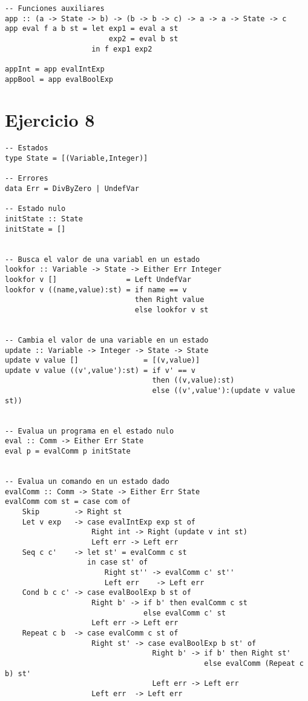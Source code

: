 \documentclass[12pt,a4paper]{article}
\begin{document}
\begin{verbatim}
-- Funciones auxiliares
app :: (a -> State -> b) -> (b -> b -> c) -> a -> a -> State -> c
app eval f a b st = let exp1 = eval a st
                        exp2 = eval b st
                    in f exp1 exp2

appInt = app evalIntExp
appBool = app evalBoolExp
\end{verbatim}

\section{Ejercicio 8}
\begin{verbatim}
-- Estados
type State = [(Variable,Integer)]

-- Errores
data Err = DivByZero | UndefVar

-- Estado nulo
initState :: State
initState = []


-- Busca el valor de una variabl en un estado
lookfor :: Variable -> State -> Either Err Integer
lookfor v []                = Left UndefVar
lookfor v ((name,value):st) = if name == v
                              then Right value
                              else lookfor v st


-- Cambia el valor de una variable en un estado
update :: Variable -> Integer -> State -> State
update v value []               = [(v,value)]
update v value ((v',value'):st) = if v' == v 
                                  then ((v,value):st)
                                  else ((v',value'):(update v value st))


-- Evalua un programa en el estado nulo
eval :: Comm -> Either Err State
eval p = evalComm p initState


-- Evalua un comando en un estado dado
evalComm :: Comm -> State -> Either Err State
evalComm com st = case com of
    Skip        -> Right st
    Let v exp   -> case evalIntExp exp st of
                    Right int -> Right (update v int st)
                    Left err -> Left err
    Seq c c'    -> let st' = evalComm c st
                   in case st' of
                       Right st'' -> evalComm c' st''
                       Left err    -> Left err
    Cond b c c' -> case evalBoolExp b st of
                    Right b' -> if b' then evalComm c st
                                else evalComm c' st
                    Left err -> Left err
    Repeat c b  -> case evalComm c st of
                    Right st' -> case evalBoolExp b st' of
                                  Right b' -> if b' then Right st'
                                              else evalComm (Repeat c b) st'
                                  Left err -> Left err
                    Left err  -> Left err



\end{verbatim}
\end{document}
